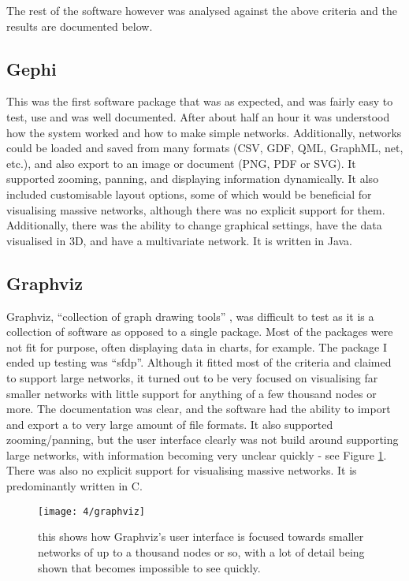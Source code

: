 \documentclass[../dissertation.tex]{subfiles}
\begin{document}
The rest of the software however was analysed against the above criteria and the results are documented below.

\subsection{Gephi}

This was the first software package that was as expected, and was fairly easy to test, use and was well documented. After about half an hour it was understood how the system worked and how to make simple networks. Additionally, networks could be loaded and saved from many formats (CSV, GDF, QML, GraphML, net, etc.), and also export to an image or document (PNG, PDF or SVG). It supported zooming, panning, and displaying information dynamically. It also included customisable layout options, some of which would be beneficial for visualising massive networks, although there was no explicit support for them. Additionally, there was the ability to change graphical settings, have the data visualised in 3D, and have a multivariate network. It is written in Java.

\subsection{Graphviz}

Graphviz, ``collection of graph drawing tools'' \cite{ellson2001graphviz}, was difficult to test as it is a collection of software as opposed to a single package. Most of the packages were not fit for purpose, often displaying data in charts, for example. The package I ended up testing was ``sfdp''. Although it fitted most of the criteria and claimed to support large networks, it turned out to be very focused on visualising far smaller networks with little support for anything of a few thousand nodes or more. The documentation was clear, and the software had the ability to import and export a to very large amount of file formats. It also supported zooming/panning, but the user interface clearly was not build around supporting large networks, with information becoming very unclear quickly - see Figure \ref{fig:graphviz}. There was also no explicit support for visualising massive networks. It is predominantly written in C.

\begin{figure}
    \centering
    \texttt{[image: 4/graphviz]}
    \caption{this shows how Graphviz's user interface is focused towards smaller networks of up to a thousand nodes or so, with a lot of detail being shown that becomes impossible to see quickly.}
    \label{fig:graphviz}
\end{figure}
\end{document}
